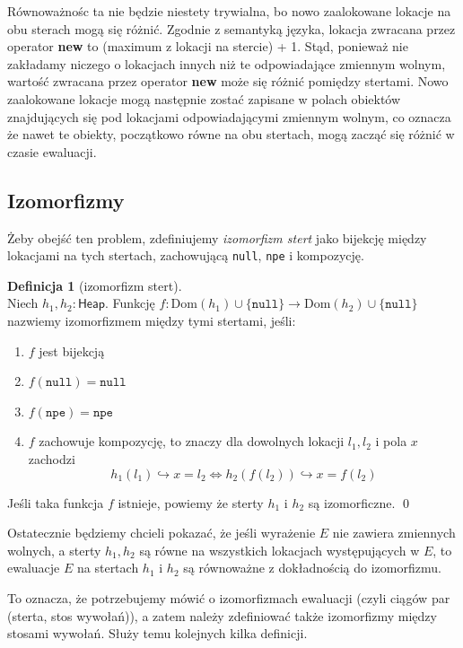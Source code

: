 \documentclass[]{pracamgr}
\renewcommand \| {\hspace{0.75em} | \hspace{0.75em} }
\renewcommand \[ {[\![}
\renewcommand \] {]\!]}
\theoremstyle{definition}
\newtheorem{definition}{Definicja}[section]
\begin{document}
Równoważnośc ta nie będzie niestety trywialna, bo nowo zaalokowane lokacje na obu sterach mogą się różnić.
Zgodnie z semantyką języka, lokacja zwracana przez operator \textbf{new} to (maximum z lokacji na stercie) + 1.
Stąd, ponieważ nie zakładamy niczego o lokacjach innych niż te odpowiadające zmiennym wolnym,
wartość zwracana przez operator \textbf{new} może się różnić pomiędzy stertami.
Nowo zaalokowane lokacje mogą następnie zostać zapisane w polach obiektów znajdujących się pod lokacjami
odpowiadającymi zmiennym wolnym, co oznacza że nawet te obiekty, początkowo równe na obu stertach,
mogą zacząć się różnić w czasie ewaluacji.

\subsection{Izomorfizmy}

Żeby obejść ten problem, zdefiniujemy \textit{izomorfizm stert} jako bijekcję między lokacjami
na tych stertach,
zachowującą \texttt{null}, \texttt{npe} i kompozycję.

\begin{definition}[izomorfizm stert] {\ } \\
Niech $h_1, h_2 : \mathsf{Heap}$.
Funkcję $f : \mathrm{Dom}(h_1) \cup \{\mathtt{null}\} \to \mathrm{Dom}(h_2) \cup \{\mathtt{null}\}$
nazwiemy izomorfizmem między tymi stertami, jeśli:
\begin{enumerate}
 \item $f$ jest bijekcją
 \item $f(\mathtt{null}) = \mathtt{null}$
 \item $f(\mathtt{npe}) = \mathtt{npe}$
 \item $f$ zachowuje kompozycję, to znaczy dla dowolnych lokacji $l_1, l_2$ i pola $x$ zachodzi
    $$h_1(l_1) \hookrightarrow x = l_2 \iff h_2(f(l_2)) \hookrightarrow x = f(l_2)$$
\end{enumerate}
Jeśli taka funkcja $f$ istnieje, powiemy że sterty $h_1$ i $h_2$ są izomorficzne.
\qed
\end{definition}

Ostatecznie będziemy chcieli pokazać, że jeśli wyrażenie $E$ nie zawiera zmiennych wolnych,
a sterty $h_1, h_2$ są równe na wszystkich lokacjach występujących w $E$, to
ewaluacje $E$ na stertach $h_1$ i $h_2$ są równoważne z dokładnością do izomorfizmu.

To oznacza, że potrzebujemy mówić o izomorfizmach ewaluacji (czyli ciągów par (sterta, stos wywołań)),
a zatem należy zdefiniować także izomorfizmy między stosami wywołań.
Służy temu kolejnych kilka definicji.
\end{document}
